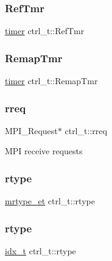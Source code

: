 \subsubsection{\texorpdfstring{Ref\+Tmr}{RefTmr}\hspace{0.1cm}{\footnotesize\ttfamily [2/2]}}
{\footnotesize\ttfamily \hyperlink{libparmetis_2struct_8h_aae821c36bb7e6918e1414484f939c3d4}{timer} ctrl\+\_\+t\+::\+Ref\+Tmr}

\mbox{\label{structctrl__t_a09be4dee7850678b5e247eba855786a8}} 
\subsubsection{\texorpdfstring{Remap\+Tmr}{RemapTmr}}
{\footnotesize\ttfamily \hyperlink{libparmetis_2struct_8h_aae821c36bb7e6918e1414484f939c3d4}{timer} ctrl\+\_\+t\+::\+Remap\+Tmr}

\mbox{\label{structctrl__t_a8cead6c0236b648ce4a71266614595ac}} 
\subsubsection{\texorpdfstring{rreq}{rreq}}
{\footnotesize\ttfamily M\+P\+I\+\_\+\+Request$\ast$ ctrl\+\_\+t\+::rreq}

M\+PI receive requests \mbox{\label{structctrl__t_a9a5e805fb214f1073f147f28f547201a}} 
\subsubsection{\texorpdfstring{rtype}{rtype}\hspace{0.1cm}{\footnotesize\ttfamily [1/2]}}
{\footnotesize\ttfamily \hyperlink{3rd_party_2parmetis-4_80_83_2metis_2include_2metis_8h_a54ec0069de1eb28daca5cf43617e57e4}{mrtype\+\_\+et} ctrl\+\_\+t\+::rtype}

\mbox{\label{structctrl__t_a00222ee6848f108df74b350480e9691f}} 
\subsubsection{\texorpdfstring{rtype}{rtype}\hspace{0.1cm}{\footnotesize\ttfamily [2/2]}}
{\footnotesize\ttfamily \hyperlink{3rd_party_2parmetis-4_80_83_2metis_2include_2metis_8h_aaa5262be3e700770163401acb0150f52}{idx\+\_\+t} ctrl\+\_\+t\+::rtype}

